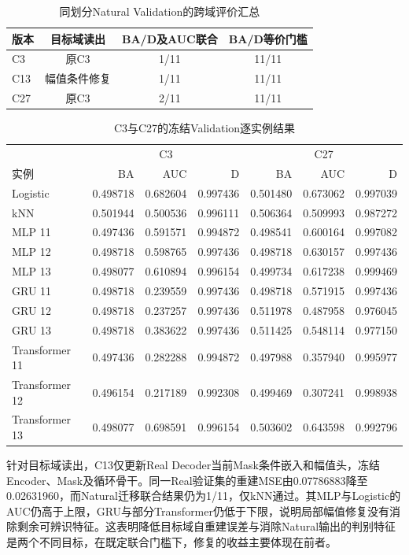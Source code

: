 \begin{table}[htbp]
 \centering\small
 \caption{同划分Natural Validation的跨域评价汇总}
 \label{tab:ch05_transfer_summary}
 \begin{tabular}{lccc}
 \hline
 版本&目标域读出&BA/D及AUC联合&BA/D等价门槛\\\hline
 C3&原C3&1/11&11/11\\
 C13&幅值条件修复&1/11&11/11\\
 C27&原C3&2/11&11/11\\\hline
 \end{tabular}
\end{table}
\begin{table}[htbp]
 \centering\footnotesize
 \caption{C3与C27的冻结Validation逐实例结果}
 \label{tab:ch05_validation_instances}
 \begin{tabular}{lrrrrrr}
 \hline
 &\multicolumn{3}{c}{C3}&\multicolumn{3}{c}{C27}\\
 实例&BA&AUC&D&BA&AUC&D\\\hline
Logistic&0.498718&0.682604&0.997436&0.501480&0.673062&0.997039\\
kNN&0.501944&0.500536&0.996111&0.506364&0.509993&0.987272\\
MLP 11&0.497436&0.591571&0.994872&0.498541&0.600164&0.997082\\
MLP 12&0.498718&0.598765&0.997436&0.498718&0.630157&0.997436\\
MLP 13&0.498077&0.610894&0.996154&0.499734&0.617238&0.999469\\
GRU 11&0.498718&0.239559&0.997436&0.498718&0.571915&0.997436\\
GRU 12&0.498718&0.237257&0.997436&0.511978&0.487958&0.976045\\
GRU 13&0.498718&0.383622&0.997436&0.511425&0.548114&0.977150\\
Transformer 11&0.497436&0.282288&0.994872&0.497988&0.357940&0.995977\\
Transformer 12&0.496154&0.217189&0.992308&0.499469&0.307241&0.998938\\
Transformer 13&0.498077&0.698591&0.996154&0.503602&0.643598&0.992796\\
 \hline
 \end{tabular}
\end{table}

针对目标域读出，C13仅更新Real Decoder当前Mask条件嵌入和幅值头，冻结Encoder、Mask及循环骨干。同一Real验证集的重建MSE由0.07786883降至0.02631960，而Natural迁移联合结果仍为1/11，仅kNN通过。其MLP与Logistic的AUC仍高于上限，GRU与部分Transformer仍低于下限，说明局部幅值修复没有消除剩余可辨识特征。这表明降低目标域自重建误差与消除Natural输出的判别特征是两个不同目标，在既定联合门槛下，修复的收益主要体现在前者。

